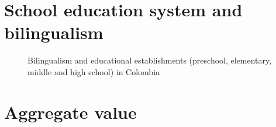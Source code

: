 \documentclass[
  ignorenonframetext,
]{beamer}
\begin{document}
\section{School education system and
bilingualism}\label{school-education-system-and-bilingualism}

\begin{frame}{}
\label{section-11}
\begin{figure}


\caption{\label{fig-bilingualism-school-col}Bilingualism and educational
establishments (preschool, elementary, middle and high school) in
Colombia}

\end{figure}%
\end{frame}

\section{Aggregate value}\label{aggregate-value}
\end{document}
